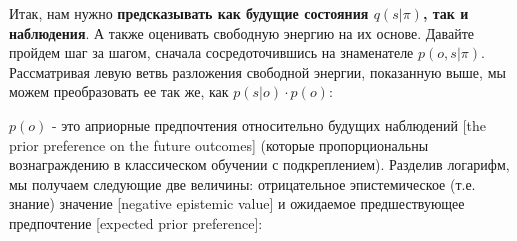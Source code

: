 \documentclass[twoside,leqno, 11pt]{article}
\begin{document}
	Итак, нам нужно \textbf{предсказывать как будущие состояния $q(s|\pi)$, так и наблюдения}. А также оценивать свободную энергию на их основе. Давайте пройдем шаг за шагом, сначала сосредоточившись на знаменателе $p(o,s|\pi)$. Рассматривая левую ветвь разложения свободной энергии, показанную выше, мы можем преобразовать ее так же, как $p(s|o) \cdot p(o)$:
	
	
	\begin{figure}[h]
	\end{figure}
	
	\newpage
	
	$p(o)$ - это априорные предпочтения относительно будущих наблюдений [the prior preference on the future outcomes] (которые пропорциональны вознаграждению в классическом обучении с подкреплением). Разделив логарифм, мы получаем следующие две величины:  отрицательное эпистемическое (т.е. знание) значение [negative epistemic value] и ожидаемое предшествующее предпочтение [expected prior preference]:
	
	
	\begin{figure}[h]
	\end{figure}
	
\end{document}
